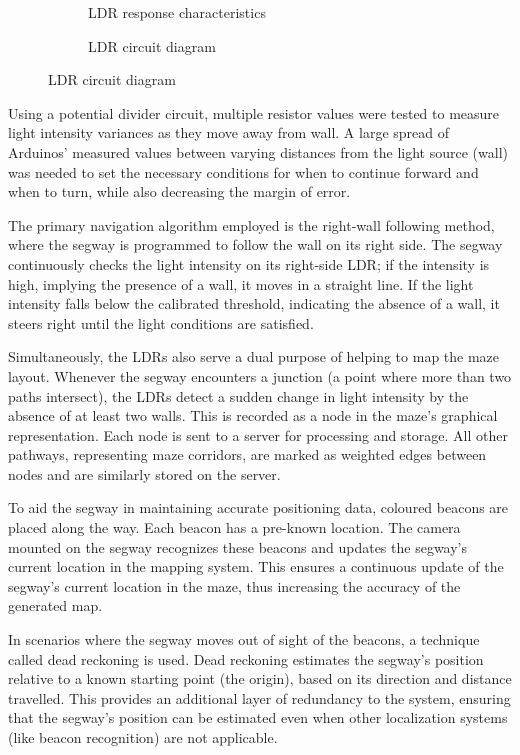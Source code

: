 \begin{figure}
    \centering
    \begin{subfigure}[b]{.45\linewidth}
        \caption{LDR response characteristics}
    \end{subfigure}
    \begin{subfigure}[b]{0.45\linewidth}
        \caption{LDR circuit diagram}
    \end{subfigure}
\end{figure}

Using a potential divider circuit, multiple resistor values were tested to measure light intensity variances as they move away from wall. A large spread of Arduinos’ measured values between varying distances from the light source (wall) was needed to set the necessary conditions for when to continue forward and when to turn, while also decreasing the margin of error.

The primary navigation algorithm employed is the right-wall following method, where the segway is programmed to follow the wall on its right side. The segway continuously checks the light intensity on its right-side LDR; if the intensity is high, implying the presence of a wall, it moves in a straight line. If the light intensity falls below the calibrated threshold, indicating the absence of a wall, it steers right until the light conditions are satisfied.

Simultaneously, the LDRs also serve a dual purpose of helping to map the maze layout. Whenever the segway encounters a junction (a point where more than two paths intersect), the LDRs detect a sudden change in light intensity by the absence of at least two walls. This is recorded as a node in the maze's graphical representation. Each node is sent to a server for processing and storage. All other pathways, representing maze corridors, are marked as weighted edges between nodes and are similarly stored on the server.

To aid the segway in maintaining accurate positioning data, coloured beacons are placed along the way. Each beacon has a pre-known location. The camera mounted on the segway recognizes these beacons and updates the segway's current location in the mapping system. This ensures a continuous update of the segway's current location in the maze, thus increasing the accuracy of the generated map.

In scenarios where the segway moves out of sight of the beacons, a technique called dead reckoning is used. Dead reckoning estimates the segway's position relative to a known starting point (the origin), based on its direction and distance travelled. This provides an additional layer of redundancy to the system, ensuring that the segway's position can be estimated even when other localization systems (like beacon recognition) are not applicable.

